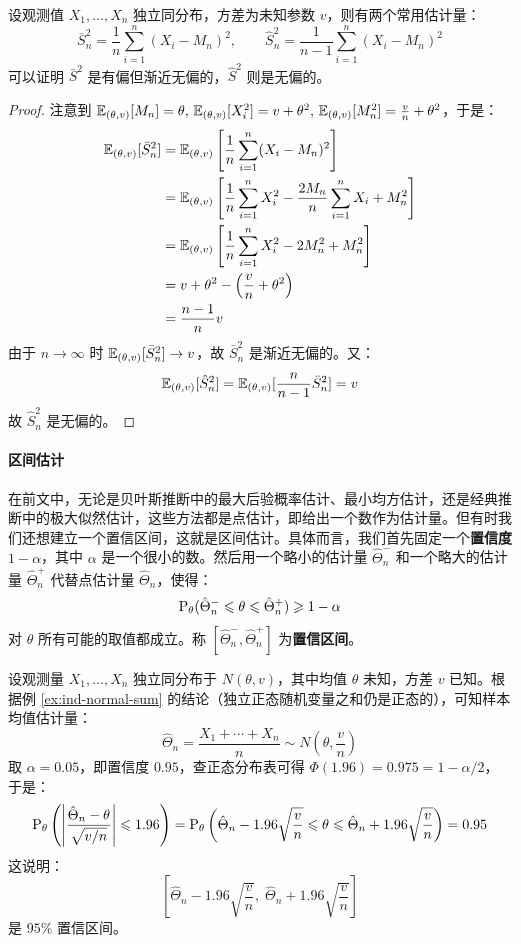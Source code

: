 \begin{example}[随机变量方差的估计]
设观测值 $X_1,\ldots,X_n$ 独立同分布，方差为未知参数 $v$，则有两个常用估计量：
\[
\bar S_n^2=\frac{1}{n}\sum\limits_{i=1}^n (X_i-M_n)^2,\qquad\hat S_n^2=\frac{1}{n-1}\sum\limits_{i=1}^n (X_i-M_n)^2
\]
可以证明 $\bar S^2$ 是有偏但渐近无偏的，$\hat S^2$ 则是无偏的。
\end{example}
\begin{proof}
注意到 $\mathbb{E}_{(\theta,v)}[M_n]=\theta,\,\mathbb{E}_{(\theta,v)}[X_i^2]=v+\theta^2,\,\mathbb{E}_{(\theta,v)}[M_n^2]=\frac{v}{n}+\theta^2$，于是：
\begin{align*}
\mathbb{E}_{(\theta,v)}[\bar S_n^2]&=\mathbb{E}_{(\theta,v)}\left[\frac{1}{n}\sum_{i=1}^n(X_i-M_n)^2\right]\\
&=\mathbb{E}_{(\theta,v)}\left[\frac{1}{n}\sum_{i=1}^nX_i^2-\frac{2M_n}{n}\sum_{i=1}^nX_i+M_n^2\right]\\
&=\mathbb{E}_{(\theta,v)}\left[\frac{1}{n}\sum_{i=1}^nX_i^2-2M_n^2+M_n^2\right]\\
&=v+\theta^2-\left(\frac{v}{n}+\theta^2\right)\\
&=\frac{n-1}{n}v
\end{align*}
由于 $n\to\infty$ 时 $\mathbb{E}_{(\theta,v)}[\bar S_n^2]\to v$，故 $\bar S_n^2$ 是渐近无偏的。又：
\[
\mathbb{E}_{(\theta,v)}[\hat S_n^2]=\mathbb{E}_{(\theta,v)}[\frac{n}{n-1}\bar S_n^2]=v
\]
故 $\hat S_n^2$ 是无偏的。
\end{proof}

\paragraph{区间估计}
在前文中，无论是贝叶斯推断中的最大后验概率估计、最小均方估计，还是经典推断中的极大似然估计，这些方法都是点估计，即给出一个数作为估计量。但有时我们还想建立一个置信区间，这就是区间估计。具体而言，我们首先固定一个\textbf{置信度} $1-\alpha$，其中 $\alpha$ 是一个很小的数。然后用一个略小的估计量 $\hat\Theta_n^-$ 和一个略大的估计量 $\hat\Theta_n^+$ 代替点估计量 $\hat\Theta_n$，使得：
\[
\mathrm{P}_\theta(\hat\Theta_n^-\leqslant\theta\leqslant\hat\Theta_n^+)\geqslant1-\alpha
\]
对 $\theta$ 所有可能的取值都成立。称 $[\hat\Theta_n^-,\hat\Theta_n^+]$ 为\textbf{置信区间}。

\begin{example}[正态随机变量公共均值的区间估计]
\label{ex:normal-mean-interval}
设观测量 $X_1,\ldots,X_n$ 独立同分布于 $N(\theta,v)$，其中均值 $\theta$ 未知，方差 $v$ 已知。根据例 \ref{ex:ind-normal-sum} 的结论（独立正态随机变量之和仍是正态的），可知样本均值估计量：
\[
\hat\Theta_n=\frac{X_1+\cdots+X_n}{n}\sim N\left(\theta,\frac{v}{n}\right)
\]
取 $\alpha=0.05$，即置信度 $0.95$，查正态分布表可得 $\Phi(1.96)=0.975=1-\alpha/2$，于是：
\[
\mathrm{P}_\theta\left(\left|\frac{\hat\Theta_n-\theta}{\sqrt{v/n}}\right|\leqslant1.96\right)=\mathrm{P}_\theta\left(\hat\Theta_n-1.96\sqrt{\frac{v}{n}}\leqslant\theta\leqslant \hat\Theta_n+1.96\sqrt{\frac{v}{n}}\right)=0.95
\]
这说明：
\[
\left[\hat\Theta_n-1.96\sqrt{\frac{v}{n}},\;\hat\Theta_n+1.96\sqrt{\frac{v}{n}}\right]
\]
是 $95\%$ 置信区间。
\end{example}

